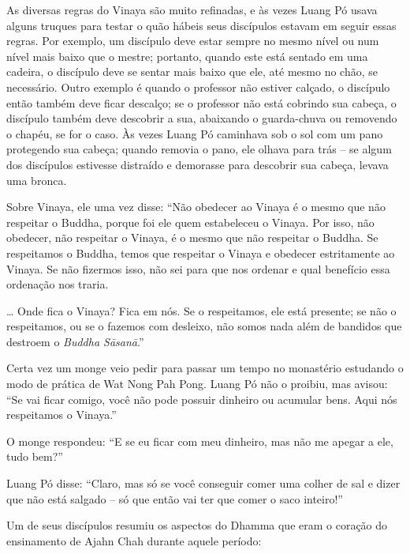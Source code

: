As diversas regras do Vinaya são muito refinadas, e às vezes Luang Pó
usava alguns truques para testar o quão hábeis seus discípulos estavam
em seguir essas regras. Por exemplo, um discípulo deve estar sempre no
mesmo nível ou num nível mais baixo que o mestre; portanto, quando este
está sentado em uma cadeira, o discípulo deve se sentar mais baixo que
ele, até mesmo no chão, se necessário. Outro exemplo é quando o
professor não estiver calçado, o discípulo então também deve ficar
descalço; se o professor não está cobrindo sua cabeça, o discípulo
também deve descobrir a sua, abaixando o guarda-chuva ou removendo o
chapéu, se for o caso. Às vezes Luang Pó caminhava sob o sol com um pano
protegendo sua cabeça; quando removia o pano, ele olhava para trás -- se
algum dos discípulos estivesse distraído e demorasse para descobrir sua
cabeça, levava uma bronca.

Sobre Vinaya, ele uma vez disse: ``Não obedecer ao Vinaya é o mesmo que
não respeitar o Buddha, porque foi ele quem estabeleceu o Vinaya. Por
isso, não obedecer, não respeitar o Vinaya, é o mesmo que não respeitar
o Buddha. Se respeitamos o Buddha, temos que respeitar o Vinaya e
obedecer estritamente ao Vinaya. Se não fizermos isso, não sei para que
nos ordenar e qual benefício essa ordenação nos traria.

\ldots{} Onde fica o Vinaya? Fica em nós. Se o respeitamos, ele está
presente; se não o respeitamos, ou se o fazemos com desleixo, não somos
nada além de bandidos que destroem o \emph{Buddha Sāsanā}.''

Certa vez um monge veio pedir para passar um tempo no monastério
estudando o modo de prática de Wat Nong Pah Pong. Luang Pó não o
proibiu, mas avisou: ``Se vai ficar comigo, você não pode possuir
dinheiro ou acumular bens. Aqui nós respeitamos o Vinaya.''

O monge respondeu: ``E se eu ficar com meu dinheiro, mas não me apegar a
ele, tudo bem?''

Luang Pó disse: ``Claro, mas só se você conseguir comer uma colher de
sal e dizer que não está salgado -- só que então vai ter que comer o
saco inteiro!''

Um de seus discípulos resumiu os aspectos do Dhamma que eram o coração
do ensinamento de Ajahn Chah durante aquele período:

